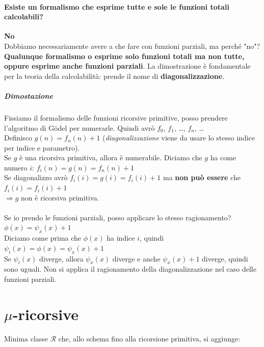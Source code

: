 \documentclass[10pt]{book}
\begin{document}
\paragraph{Esiste un formalismo che esprime tutte e sole le funzioni totali calcolabili?} \textbf{No}\\
Dobbiamo necessariamente avere a che fare con funzioni parziali, ma perché "no"?\\
\textbf{Qualunque formalismo o esprime solo funzioni totali ma non tutte, oppure esprime anche funzioni parziali}. La dimostrazione è fondamentale per la teoria della calcolabilità: prende il nome di \textbf{diagonalizzazione}.
\subparagraph{Dimostazione} Fissiamo il formalismo delle funzioni ricorsive primitive, posso prendere l'algoritmo di G\"{o}del per numerarle. Quindi avrò $f_0$, $f_1$, \ldots, $f_n$, \ldots\\
Definisco $g(n) = f_n(n) + 1$ (\textit{diagonalizzazione} viene da usare lo stesso indice per indice e parametro).\\
Se $g$ è una ricorsiva primitiva, allora è numerabile. Diciamo che $g$ ha come numero $i$: $f_i(n) = g(n) = f_n(n) + 1$\\
Se diagonalizzo avrò $f_i(i) = g(i) = f_i(i) + 1$ ma \textbf{non può essere} che $f_i(i) = f_i(i) + 1$\\
$\Rightarrow g$ non è ricorsiva primitiva.\\\\
Se io prendo le funzioni parziali, posso applicare lo stesso ragionamento?\\
$\phi(x) = \psi_x(x) + 1$\\
Diciamo come prima che $\phi(x)$ ha indice $i$, quindi $\psi_i(x) = \phi(x) = \psi_x(x) + 1$\\
Se $\psi_i(x)$ diverge, allora $\psi_x(x)$ diverge e anche $\psi_x(x) + 1$ diverge, quindi sono uguali. Non si applica il ragionamento della diagonalizzazione nel caso delle funzioni parziali.
\section{$\mu$-ricorsive}
Minima classe $\mathscr{R}$ che, allo schema fino alla ricorsione primitiva, si aggiunge:
\end{document}
